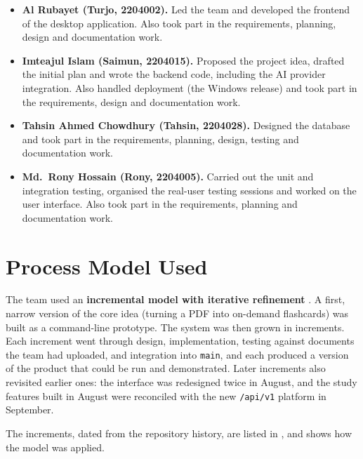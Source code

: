 \begin{itemize}
  \item \textbf{Al Rubayet (Turjo, 2204002).} Led the team and developed the frontend of
  the desktop application. Also took part in the requirements, planning, design and
  documentation work.
  \item \textbf{Imteajul Islam (Saimun, 2204015).} Proposed the project idea, drafted the
  initial plan and wrote the backend code, including the AI provider integration. Also
  handled deployment (the Windows release) and took part in the requirements, design and
  documentation work.
  \item \textbf{Tahsin Ahmed Chowdhury (Tahsin, 2204028).} Designed the database and took
  part in the requirements, planning, design, testing and documentation work.
  \item \textbf{Md.~Rony Hossain (Rony, 2204005).} Carried out the unit and integration
  testing, organised the real-user testing sessions and worked on the user interface. Also
  took part in the requirements, planning and documentation work.
\end{itemize}

\section{Process Model Used}

The team used an \textbf{incremental model with iterative refinement}
\cite{pressman2019,sommerville2016}. A first, narrow version of the core idea (turning a PDF
into on-demand flashcards) was built as a command-line prototype. The system was then
grown in increments. Each increment went through design, implementation, testing against
documents the team had uploaded, and integration into \texttt{main}, and each produced a
version of the product that could be run and demonstrated. Later increments also revisited
earlier ones: the interface was redesigned twice in August, and the study features built
in August were reconciled with the new \texttt{/api/v1} platform in September.

The increments, dated from the repository history, are listed in ,
and  shows how the model was applied.


